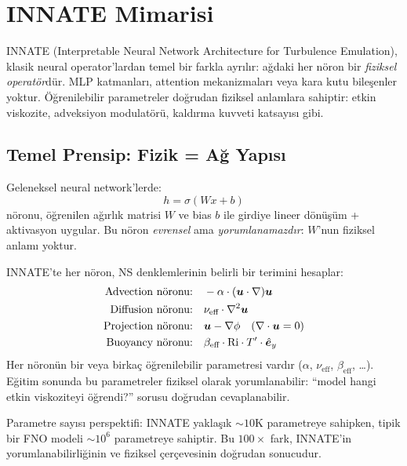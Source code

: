 
\chapter{INNATE Mimarisi}
\label{ch:innate_mimari}

INNATE (Interpretable Neural Network Architecture for Turbulence Emulation), klasik neural operator'lardan temel bir farkla ayrılır: ağdaki her nöron bir \textit{fiziksel operatör}dür. MLP katmanları, attention mekanizmaları veya kara kutu bileşenler yoktur. \"Oğrenilebilir parametreler doğrudan fiziksel anlamlara sahiptir: etkin viskozite, adveksiyon modulatörü, kaldırma kuvveti katsayısı gibi.


\section{Temel Prensip: Fizik = Ağ Yapısı}
\label{sec:temel_prensip}

Geleneksel neural network'lerde:
\[
    h = \sigma(Wx + b)
\]
nöronu, öğrenilen ağırlık matrisi $W$ ve bias $b$ ile girdiye lineer dönüşüm + aktivasyon uygular. Bu nöron \textit{evrensel} ama \textit{yorumlanamazdır}: $W$'nun fiziksel anlamı yoktur.

INNATE'te her nöron, NS denklemlerinin belirli bir terimini hesaplar:
\begin{align}
    \text{Advection nöronu:} &\quad -\alpha \cdot (\bm{u} \cdot \nabla)\bm{u} \\
    \text{Diffusion nöronu:} &\quad \nu_{\text{eff}} \cdot \nabla^2 \bm{u} \\
    \text{Projection nöronu:} &\quad \bm{u} - \nabla \phi \quad (\nabla \cdot \bm{u} = 0) \\
    \text{Buoyancy nöronu:} &\quad \beta_{\text{eff}} \cdot \mathrm{Ri} \cdot T' \cdot \hat{\bm{e}}_y
\end{align}
Her nöronün bir veya birkaç öğrenilebilir parametresi vardır ($\alpha$, $\nu_{\text{eff}}$, $\beta_{\text{eff}}$, \ldots). Eğitim sonunda bu parametreler fiziksel olarak yorumlanabilir: ``model hangi etkin viskoziteyi öğrendi?'' sorusu doğrudan cevaplanabilir.

\begin{remark}
Parametre sayısı perspektifi: INNATE yaklaşık $\sim 10$K parametreye sahipken, tipik bir FNO modeli $\sim 10^6$ parametreye sahiptir. Bu $100\times$ fark, INNATE'in yorumlanabilirliğinin ve fiziksel çerçevesinin doğrudan sonucudur.
\end{remark}


